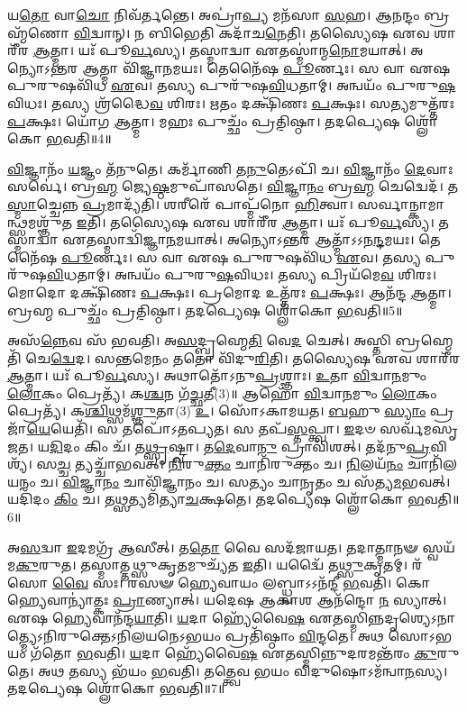 𑌯\-\ul{𑌤𑍋} 𑌵𑌾\-\ul{𑌚𑍋} 𑌨𑌿𑌵᳴𑌰𑍍𑌤𑌨𑍍𑌤𑍇। 
𑌅𑌪𑍍𑌰𑌾॑\-\ul{𑌪𑍍𑌯} 𑌮𑌨᳴𑌸𑌾 \ul{𑌸}\-𑌹। 
𑌆𑌨𑌨𑍍𑌦𑌂 𑌬𑍍𑌰𑌹𑍍𑌮᳴𑌣𑍋 \ul{𑌵𑌿}\-𑌦𑍍𑌵𑌾𑌨𑍍। 
𑌨 𑌬𑌿𑌭𑍇𑌤𑌿 𑌕𑌦𑌾᳴𑌚\-\ul{𑌨𑍇}\-𑌤𑌿। 
𑌤𑌸𑍍𑌯𑍈𑌷 𑌏𑌵 𑌶𑌾𑌰𑍀᳴𑌰 \ul{𑌆}\-𑌤𑍍𑌮𑌾। 
𑌯𑌃᳴ 𑌪𑍂\-\ul{𑌰𑍍𑌵}\-𑌸𑍍𑌯। 
𑌤𑌸𑍍𑌮𑌾𑌦𑍍𑌵𑌾 𑌏𑌤𑌸𑍍𑌮𑌾॑𑌨𑍍𑌮\-\ul{𑌨𑍋}\-𑌮𑌯𑌾𑌤𑍍। 
𑌅𑌨𑍍𑌯𑍋𑌽𑌨𑍍𑌤𑌰 𑌆𑌤𑍍𑌮𑌾 𑌵𑌿᳴𑌜𑍍𑌞𑌾\-\ul{𑌨}\-𑌮𑌯𑌃। 
𑌤𑍇𑌨𑍈᳴𑌷 \ul{𑌪𑍂}\-𑌰𑍍𑌣𑌃। 
𑌸 𑌵𑌾 𑌏𑌷 𑌪𑍁𑌰𑍁𑌷𑌵𑌿᳴𑌧 \ul{𑌏}\-𑌵। 
𑌤𑌸𑍍𑌯 𑌪𑍁𑌰𑍁᳴𑌷\-\ul{𑌵𑌿}\-𑌧𑌤𑌾𑌮𑍍। 
𑌅𑌨𑍍𑌵𑌯𑌂᳴ 𑌪𑍁𑌰𑍁\-\ul{𑌷}\-𑌵𑌿𑌧𑌃। 
𑌤𑌸𑍍𑌯 𑌶𑍍𑌰᳴𑌦𑍍𑌧𑍈\-\ul{𑌵} 𑌶𑌿𑌰𑌃। 
𑌋𑌤𑌂 𑌦𑌕𑍍𑌷𑌿᳴𑌣𑌃 \ul{𑌪}\-𑌕𑍍𑌷𑌃। 
𑌸𑌤𑍍𑌯𑌮𑍁𑌤𑍍𑌤᳴𑌰𑌃 \ul{𑌪}\-𑌕𑍍𑌷𑌃। 
𑌯𑍋᳴𑌗 \ul{𑌆}\-𑌤𑍍𑌮𑌾। 
𑌮𑌹𑌃 𑌪𑍁𑌚𑍍𑌛𑌂᳴ 𑌪𑍍𑌰𑌤𑌿\-॒𑌷𑍍𑌠𑌾। 
𑌤𑌦𑌪𑍍𑌯𑍇𑌷 𑌶𑍍𑌲𑍋᳴𑌕𑍋 \ul{𑌭}\-𑌵𑌤𑌿॥4॥

\-\ul{𑌵𑌿}\-𑌜𑍍𑌞𑌾𑌨𑌂᳴ \ul{𑌯}\-𑌜𑍍𑌞𑌂 𑌤᳴𑌨𑍁𑌤𑍇। 
𑌕𑌰𑍍𑌮𑌾᳴𑌣𑌿 𑌤\-\ul{𑌨𑍁}\-𑌤𑍇𑌽𑌪𑌿᳴ 𑌚। 
\-\ul{𑌵𑌿}\-𑌜𑍍𑌞𑌾𑌨𑌂᳴ \ul{𑌦𑍇}\-𑌵𑌾𑌃 𑌸𑌰𑍍𑌵𑍇॑। 
𑌬𑍍𑌰\-\ul{𑌹𑍍𑌮} 𑌜𑍍𑌯𑍇\-\ul{𑌷𑍍𑌠}\-𑌮𑍁𑌪𑌾᳴𑌸𑌤𑍇। 
\-\ul{𑌵𑌿}\-𑌜𑍍𑌞𑌾\-\ul{𑌨𑌂} 𑌬𑍍𑌰\-\ul{𑌹𑍍𑌮} 𑌚𑍇𑌦𑍍𑌵𑍇𑌦᳴। 
𑌤\-\ul{𑌸𑍍𑌮𑌾}\-𑌚𑍍𑌚𑍇𑌨𑍍𑌨 \ul{𑌪𑍍𑌰}\-𑌮𑌾𑌦𑍍𑌯᳴𑌤𑌿। 
𑌶𑌰𑍀𑌰𑍇᳴ 𑌪𑌾𑌪𑍍𑌮᳴𑌨𑍋 \ul{𑌹𑌿}\-𑌤𑍍𑌵𑌾। 
𑌸𑌰𑍍𑌵𑌾𑌨𑍍𑌕𑌾𑌮𑌾𑌨𑍍𑌥𑍍𑌸𑌮𑌶𑍍𑌞𑍁᳴𑌤 \ul{𑌇}\-𑌤𑌿। 
𑌤𑌸𑍍𑌯𑍈𑌷 𑌏𑌵 𑌶𑌾𑌰𑍀᳴𑌰 \ul{𑌆}\-𑌤𑍍𑌮𑌾। 
𑌯𑌃᳴ 𑌪𑍂\-\ul{𑌰𑍍𑌵}\-𑌸𑍍𑌯। 
𑌤𑌸𑍍𑌮𑌾𑌦𑍍𑌵𑌾 𑌏𑌤𑌸𑍍𑌮𑌾𑌦𑍍𑌵𑌿᳴𑌜𑍍𑌞𑌾\-\ul{𑌨}\-𑌮𑌯𑌾𑌤𑍍। 
𑌅𑌨𑍍𑌯𑍋𑌽𑌨𑍍𑌤𑌰 𑌆𑌤𑍍𑌮𑌾᳴𑌽𑌽𑌨\-\ul{𑌨𑍍𑌦}\-𑌮𑌯𑌃। 
𑌤𑍇𑌨𑍈᳴𑌷 \ul{𑌪𑍂}\-𑌰𑍍𑌣𑌃। 
𑌸 𑌵𑌾 𑌏𑌷 𑌪𑍁𑌰𑍁𑌷𑌵𑌿᳴𑌧 \ul{𑌏}\-𑌵। 
𑌤𑌸𑍍𑌯 𑌪𑍁𑌰𑍁᳴𑌷\-\ul{𑌵𑌿}\-𑌧𑌤𑌾𑌮𑍍। 
𑌅𑌨𑍍𑌵𑌯𑌂᳴ 𑌪𑍁𑌰𑍁\-\ul{𑌷}\-𑌵𑌿𑌧𑌃। 
𑌤𑌸𑍍𑌯 𑌪𑍍𑌰𑌿𑌯᳴𑌮𑍇\-\ul{𑌵} 𑌶𑌿𑌰𑌃। 
𑌮𑍋𑌦𑍋 𑌦𑌕𑍍𑌷𑌿᳴𑌣𑌃 \ul{𑌪}\-𑌕𑍍𑌷𑌃। 
𑌪𑍍𑌰𑌮𑍋𑌦 𑌉𑌤𑍍𑌤᳴𑌰𑌃 \ul{𑌪}\-𑌕𑍍𑌷𑌃। 
𑌆𑌨᳴𑌨𑍍𑌦 \ul{𑌆}\-𑌤𑍍𑌮𑌾। 
𑌬𑍍𑌰𑌹𑍍𑌮 𑌪𑍁𑌚𑍍𑌛𑌂᳴ 𑌪𑍍𑌰𑌤𑌿\-॒𑌷𑍍𑌠𑌾। 
𑌤𑌦𑌪𑍍𑌯𑍇𑌷 𑌶𑍍𑌲𑍋᳴𑌕𑍋 \ul{𑌭}\-𑌵𑌤𑌿॥5॥

𑌅𑌸᳴\-\ul{𑌨𑍍𑌨𑍇}\-𑌵 𑌸᳴ 𑌭𑌵𑌤𑌿। 
𑌅\-\ul{𑌸}\-𑌦𑍍𑌬𑍍𑌰𑌹𑍍𑌮𑍇\-\ul{𑌤𑌿} 𑌵𑍇\-\ul{𑌦} 𑌚𑍇𑌤𑍍। 
𑌅𑌸𑍍𑌤𑌿 𑌬𑍍𑌰𑌹𑍍𑌮𑍇𑌤𑌿᳴ 𑌚𑍇\-\ul{𑌦𑍍𑌵𑍇}\-𑌦। 
𑌸𑌨𑍍𑌤𑌮𑍇𑌨𑌂 𑌤𑌤𑍋 𑌵𑌿᳴𑌦𑍁\-\ul{𑌰𑌿}\-𑌤𑌿। 
𑌤𑌸𑍍𑌯𑍈𑌷 𑌏𑌵 𑌶𑌾𑌰𑍀᳴𑌰 \ul{𑌆}\-𑌤𑍍𑌮𑌾। 
𑌯𑌃᳴ 𑌪𑍂\-\ul{𑌰𑍍𑌵}\-𑌸𑍍𑌯। 
𑌅𑌥𑌾𑌤𑍋᳴𑌽𑌨𑍁\-\ul{𑌪𑍍𑌰}\-𑌶𑍍𑌞𑌾𑌃। 
\-\ul{𑌉}\-𑌤𑌾 \ul{𑌵𑌿}\-𑌦𑍍𑌵𑌾\-\ul{𑌨}\-𑌮𑍁𑌂 \ul{𑌲𑍋}\-𑌕𑌂 𑌪𑍍𑌰𑍇𑌤𑍍𑌯᳴। 
𑌕\-\ul{𑌶𑍍𑌚}\-𑌨 𑌗᳴\-\ul{𑌚𑍍𑌛}\-𑌤𑍀(3)॥ 𑌆𑌹𑍋᳴ \ul{𑌵𑌿}\-𑌦𑍍𑌵𑌾\-\ul{𑌨}\-𑌮𑍁𑌂 \ul{𑌲𑍋}\-𑌕𑌂 𑌪𑍍𑌰𑍇𑌤𑍍𑌯᳴। 
𑌕\-\ul{𑌶𑍍𑌚𑌿}\-𑌥𑍍𑌸𑌮᳴\-\ul{𑌶𑍍𑌞𑍁}\-𑌤𑌾(3) \ul{𑌉}\-। 
𑌸𑍋᳴𑌽𑌕𑌾𑌮𑌯𑌤। 
\-\ul{𑌬}\-𑌹𑍁 \ul{𑌸𑍍𑌯𑌾𑌂} 𑌪𑍍𑌰𑌜𑌾᳴\-\ul{𑌯𑍇}\-𑌯𑍇𑌤𑌿᳴। 
𑌸 𑌤𑌪𑍋᳴𑌽𑌤𑌪𑍍𑌯𑌤। 
𑌸 𑌤𑌪᳴\-\ul{𑌸𑍍𑌤}\-𑌪𑍍𑌤𑍍𑌵𑌾। 
\-\ul{𑌇}\-𑌦𑍞 𑌸𑌰𑍍𑌵᳴𑌮𑌸𑍃𑌜𑌤। 
𑌯\-\ul{𑌦𑌿}\-𑌦𑌂 𑌕𑌿𑌂 𑌚᳴। 
𑌤\-\ul{𑌥𑍍𑌸𑍃}\-𑌷𑍍𑌟𑍍𑌵𑌾। 
𑌤\-\ul{𑌦𑍇}\-𑌵𑌾\-\ul{𑌨𑍁} 𑌪𑍍𑌰𑌾𑌵𑌿᳴𑌶𑌤𑍍। 
𑌤𑌦᳴𑌨𑍁\-\ul{𑌪𑍍𑌰}\-𑌵𑌿𑌶𑍍𑌯᳴। 
𑌸\-\ul{𑌚𑍍𑌚} 𑌤𑍍𑌯𑌚𑍍𑌚𑌾᳴𑌭𑌵𑌤𑍍। 
\-\ul{𑌨𑌿}\-𑌰𑍁\-\ul{𑌕𑍍𑌤𑌂} 𑌚𑌾𑌨𑌿᳴𑌰𑍁𑌕𑍍𑌤𑌂 𑌚। 
\-\ul{𑌨𑌿}\-𑌲𑌯᳴\-\ul{𑌨𑌂} 𑌚𑌾𑌨𑌿᳴𑌲𑌯𑌨𑌂 𑌚। 
\-\ul{𑌵𑌿}\-𑌜𑍍𑌞𑌾\-\ul{𑌨𑌂} 𑌚𑌾𑌵𑌿᳴𑌜𑍍𑌞𑌾𑌨𑌂 𑌚। 
𑌸𑌤𑍍𑌯𑌂 𑌚𑌾𑌨𑍃𑌤𑌂 𑌚 𑌸᳴𑌤𑍍𑌯\-\ul{𑌮}\-𑌭𑌵𑌤𑍍। 
𑌯𑌦𑌿᳴𑌦𑌂 \ul{𑌕𑌿𑌂} 𑌚। 
𑌤𑌥𑍍𑌸𑌤𑍍𑌯𑌮𑌿᳴𑌤𑍍𑌯𑌾\-\ul{𑌚}\-𑌕𑍍𑌷𑌤𑍇। 
𑌤𑌦𑌪𑍍𑌯𑍇𑌷 𑌶𑍍𑌲𑍋᳴𑌕𑍋 \ul{𑌭}\-𑌵𑌤𑌿॥6॥

𑌅\-\ul{𑌸}\-𑌦𑍍𑌵𑌾 \ul{𑌇}\-𑌦𑌮𑌗𑍍𑌰᳴ 𑌆𑌸𑍀𑌤𑍍। 
𑌤\-\ul{𑌤𑍋} 𑌵𑍈 𑌸𑌦᳴𑌜𑌾𑌯𑌤। 
𑌤𑌦𑌾𑌤𑍍𑌮𑌾𑌨𑍟 𑌸𑍍𑌵𑌯᳴𑌮\-\ul{𑌕𑍁}\-𑌰𑍁𑌤। 
𑌤𑌸𑍍𑌮𑌾𑌤𑍍𑌤𑌥𑍍𑌸𑍁𑌕𑍃𑌤𑌮𑍁𑌚𑍍𑌯᳴𑌤 \ul{𑌇}\-𑌤𑌿। 
𑌯𑌦𑍍𑌵𑍈᳴ 𑌤\-\ul{𑌥𑍍𑌸𑍁}\-𑌕𑍃𑌤𑌮𑍍। 
𑌰᳴𑌸𑍋 \ul{𑌵𑍈} 𑌸𑌃। 
𑌰𑌸𑍟 𑌹𑍍𑌯𑍇𑌵𑌾𑌯𑌂 𑌲𑌬𑍍𑌧𑍍𑌵𑌾𑌽𑌽𑌨᳴𑌨𑍍𑌦𑍀 \ul{𑌭}\-𑌵𑌤𑌿। 
𑌕𑍋 𑌹𑍍𑌯𑍇𑌵𑌾𑌨𑍍𑌯𑌾॑𑌤𑍍𑌕𑌃 \ul{𑌪𑍍𑌰𑌾}\-𑌣𑍍𑌯𑌾𑌤𑍍। 
𑌯𑌦𑍇𑌷 𑌆𑌕𑌾𑌶 𑌆𑌨᳴𑌨𑍍𑌦𑍋 \ul{𑌨} 𑌸𑍍𑌯𑌾𑌤𑍍। 
𑌏𑌷 𑌹𑍍𑌯𑍇𑌵𑌾𑌨᳴𑌨𑍍𑌦\-\ul{𑌯𑌾}\-𑌤𑌿। 
\-\ul{𑌯}\-𑌦𑌾 𑌹𑍍𑌯𑍇᳴𑌵𑍈\-\ul{𑌷} 𑌏𑌤𑌸𑍍𑌮𑌿𑌨𑍍𑌨𑌦𑍃𑌶𑍍𑌯𑍇𑌽𑌨𑌾𑌤𑍍𑌮𑍍𑌯𑍇𑌽𑌨𑌿𑌰𑍁𑌕𑍍𑌤𑍇𑌽𑌨𑌿𑌲𑌯𑌨𑍇𑌽𑌭𑌯𑌂 𑌪𑍍𑌰𑌤𑌿᳴\-𑌷𑍍𑌠𑌾𑌂 \ul{𑌵𑌿}\-𑌨𑍍𑌦𑌤𑍇। 
𑌅𑌥 𑌸𑍋𑌽𑌭𑌯𑌂 𑌗᳴𑌤𑍋 \ul{𑌭}\-𑌵𑌤𑌿। 
\-\ul{𑌯}\-𑌦𑌾 𑌹𑍍𑌯𑍇᳴𑌵𑍈\-\ul{𑌷} 𑌏𑌤𑌸𑍍𑌮𑌿𑌨𑍍𑌨𑍁𑌦𑌰𑌮𑌨𑍍𑌤᳴𑌰𑌂 \ul{𑌕𑍁}\-𑌰𑍁𑌤𑍇। 
𑌅𑌥 𑌤𑌸𑍍𑌯 𑌭᳴𑌯𑌂 \ul{𑌭}\-𑌵𑌤𑌿। 
𑌤𑌤𑍍𑌤𑍍𑌵𑍇𑌵 𑌭𑌯𑌂 𑌵𑌿𑌦𑍁𑌷𑍋𑌽𑌮᳴𑌨𑍍𑌵𑌾\-\ul{𑌨}\-𑌸𑍍𑌯। 
𑌤𑌦𑌪𑍍𑌯𑍇𑌷 𑌶𑍍𑌲𑍋᳴𑌕𑍋 \ul{𑌭}\-𑌵𑌤𑌿॥7॥

